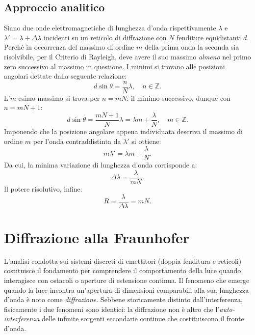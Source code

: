\documentclass[a4paper,11pt]{report}
\begin{document}
\subsection{Approccio analitico}
Siano due onde elettromagnetiche di lunghezza d'onda rispettivamente $\lambda$ e $\lambda' = \lambda + \Delta \lambda$ incidenti su un reticolo di diffrazione con $N$ fenditure equidistanti $d$. Perché in occorrenza del massimo di ordine $m$ della prima onda la seconda sia risolvibile, per il Criterio di Rayleigh, deve avere il suo massimo \textit{almeno} nel primo zero successivo al massimo in questione. I minimi si trovano alle posizioni angolari dettate dalla seguente relazione:
\begin{equation}
    d\sin\theta = \frac{n}{N}\lambda, \quad n \in \mathbb{Z}.
\end{equation}
L'$m$-esimo massimo si trova per $n = mN$: il minimo successivo, dunque con $n = mN +1$:
\begin{equation}
    d\sin\theta = \frac{mN+1}{N}\lambda = \lambda m + \frac{\lambda}{N}, \quad m \in \mathbb{Z}.
\end{equation}
Imponendo che la posizione angolare appena individuata descriva il massimo di ordine $m$ per l'onda contraddistinta da $\lambda'$ si ottiene:
\begin{equation}
    m\lambda' = \lambda m + \frac{\lambda}{N}.
\end{equation}
Da cui, la minima variazione di lunghezza d'onda corrisponde a:
\begin{equation}
    \Delta\lambda = \frac{\lambda}{mN}.
\end{equation}
Il potere risolutivo, infine:
\begin{equation}
    R = \frac{\lambda}{\Delta\lambda} = {mN}.
\end{equation}

\section{Diffrazione alla Fraunhofer}
L'analisi condotta sui sistemi discreti di emettitori (doppia fenditura e reticoli) costituisce il fondamento per comprendere il comportamento della luce quando interagisce con ostacoli o aperture di estensione continua.
Il fenomeno che emerge quando la luce incontra un'apertura di dimensioni comparabili alla sua lunghezza d'onda è noto come \textit{diffrazione}. Sebbene storicamente distinto dall'interferenza, fisicamente i due fenomeni sono identici: la diffrazione non è altro che l'\textit{auto-interferenza} delle infinite sorgenti secondarie continue che costituiscono il fronte d'onda.
\end{document}
